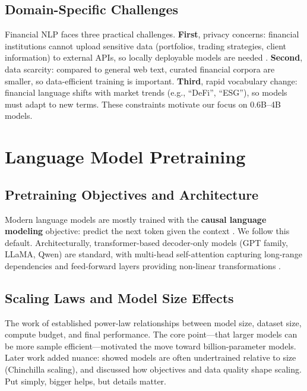 \subsection{Domain-Specific Challenges}

Financial NLP faces three practical challenges. \textbf{First}, privacy concerns: financial institutions cannot upload sensitive data (portfolios, trading strategies, client information) to external APIs, so locally deployable models are needed \parencite{wu2023bloomberggpt}. \textbf{Second}, data scarcity: compared to general web text, curated financial corpora are smaller, so data-efficient training is important. \textbf{Third}, rapid vocabulary change: financial language shifts with market trends (e.g., ``DeFi'', ``ESG''), so models must adapt to new terms. These constraints motivate our focus on 0.6B–4B models.

\section{Language Model Pretraining}

\subsection{Pretraining Objectives and Architecture}

Modern language models are mostly trained with the \textbf{causal language modeling} objective: predict the next token given the context \parencite{radford2019language, brown2020language}. We follow this default. Architecturally, transformer-based decoder-only models (GPT family, LLaMA, Qwen) are standard, with multi-head self-attention capturing long-range dependencies and feed-forward layers providing non-linear transformations \parencite{vaswani2017attention, touvron2023llama}.

\subsection{Scaling Laws and Model Size Effects}

The work of \textcite{kaplan2020scaling} established power-law relationships between model size, dataset size, compute budget, and final performance. The core point—that larger models can be more sample efficient—motivated the move toward billion-parameter models. Later work added nuance: \textcite{hoffmann2022training} showed models are often undertrained relative to size (Chinchilla scaling), and \textcite{tay2022ul2} discussed how objectives and data quality shape scaling. Put simply, bigger helps, but details matter.

